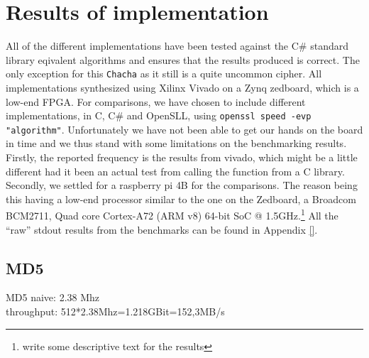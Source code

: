 \documentclass[a4paper]{article}
\begin{document}
\section{Results of implementation}
\label{sec:orgbce6a6d}
All of the different implementations have been tested against the C\# standard library eqivalent algorithms and ensures that the results produced is correct. The only exception for this \texttt{Chacha} as it still is a quite uncommon cipher. All implementations synthesized using Xilinx Vivado on a Zynq zedboard, which is a low-end FPGA. For comparisons, we have chosen to include different implementations, in C, C\# and OpenSLL, using \texttt{openssl speed -evp "algorithm"}. Unfortunately we have not been able to get our hands on the board in time and we thus stand with some limitations on the benchmarking results. Firstly, the reported frequency is the results from vivado, which might be a little different had it been an actual test from calling the function from a C library.  Secondly, we settled for a raspberry pi 4B for the comparisons. The reason being this having a low-end processor similar to the one on the Zedboard, a Broadcom BCM2711, Quad core Cortex-A72 (ARM v8) 64-bit SoC @ 1.5GHz.\footnote{write some descriptive text for the results} All the ``raw'' stdout results from the benchmarks can be found in Appendix \ref{}.
\subsection{MD5}
\label{sec:org4a58d86}
MD5 naive: 2.38 Mhz\\
throughput: 512*2.38Mhz=1.218GBit=152,3MB/s
\end{document}
